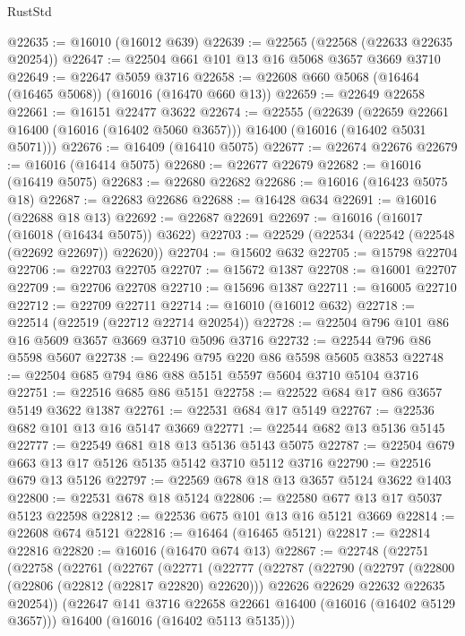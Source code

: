 \begin{lexlean}{RustStd}
\begin{coremodule}
@22635 := @16010 (@16012 @639)
@22639 := @22565 (@22568 (@22633 @22635 @20254))
@22647 := @22504 @661 @101 @13 @16 @5068 @3657 @3669 @3710
@22649 := @22647 @5059 @3716
@22658 := @22608 @660 @5068 (@16464 (@16465 @5068)) (@16016 (@16470 @660 @13))
@22659 := @22649 @22658
@22661 := @16151 @22477 @3622
@22674 := @22555
    (@22639
      (@22659 @22661 @16400 (@16016 (@16402 @5060 @3657)))
      @16400
      (@16016 (@16402 @5031 @5071)))
@22676 := @16409 (@16410 @5075)
@22677 := @22674 @22676
@22679 := @16016 (@16414 @5075)
@22680 := @22677 @22679
@22682 := @16016 (@16419 @5075)
@22683 := @22680 @22682
@22686 := @16016 (@16423 @5075 @18)
@22687 := @22683 @22686
@22688 := @16428 @634
@22691 := @16016 (@22688 @18 @13)
@22692 := @22687 @22691
@22697 := @16016 (@16017 (@16018 (@16434 @5075)) @3622)
@22703 := @22529 (@22534 (@22542 (@22548 (@22692 @22697)) @22620))
@22704 := @15602 @632
@22705 := @15798 @22704
@22706 := @22703 @22705
@22707 := @15672 @1387
@22708 := @16001 @22707
@22709 := @22706 @22708
@22710 := @15696 @1387
@22711 := @16005 @22710
@22712 := @22709 @22711
@22714 := @16010 (@16012 @632)
@22718 := @22514 (@22519 (@22712 @22714 @20254))
@22728 := @22504 @796 @101 @86 @16 @5609 @3657 @3669 @3710 @5096 @3716
@22732 := @22544 @796 @86 @5598 @5607
@22738 := @22496 @795 @220 @86 @5598 @5605 @3853
@22748 := @22504 @685 @794 @86 @88 @5151 @5597 @5604 @3710 @5104 @3716
@22751 := @22516 @685 @86 @5151
@22758 := @22522 @684 @17 @86 @3657 @5149 @3622 @1387
@22761 := @22531 @684 @17 @5149
@22767 := @22536 @682 @101 @13 @16 @5147 @3669
@22771 := @22544 @682 @13 @5136 @5145
@22777 := @22549 @681 @18 @13 @5136 @5143 @5075
@22787 := @22504 @679 @663 @13 @17 @5126 @5135 @5142 @3710 @5112 @3716
@22790 := @22516 @679 @13 @5126
@22797 := @22569 @678 @18 @13 @3657 @5124 @3622 @1403
@22800 := @22531 @678 @18 @5124
@22806 := @22580 @677 @13 @17 @5037 @5123 @22598
@22812 := @22536 @675 @101 @13 @16 @5121 @3669
@22814 := @22608 @674 @5121
@22816 := @16464 (@16465 @5121)
@22817 := @22814 @22816
@22820 := @16016 (@16470 @674 @13)
@22867 := @22748
    (@22751
      (@22758
        (@22761
          (@22767
            (@22771
              (@22777
                (@22787
                  (@22790
                    (@22797
                      (@22800 (@22806 (@22812 (@22817 @22820) @22620)))
                      @22626
                      @22629
                      @22632
                      @22635
                      @20254))
                  (@22647 @141 @3716 @22658 @22661 @16400 (@16016 (@16402 @5129 @3657)))
                  @16400
                  (@16016 (@16402 @5113 @5135)))

\end{coremodule}
\end{lexlean}
